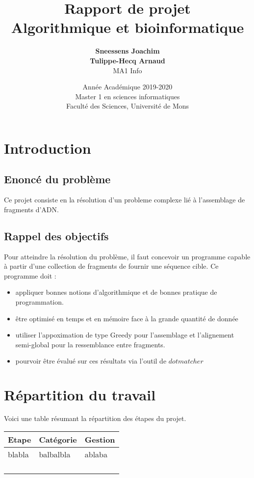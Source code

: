 \documentclass{article}
\title{
{\Huge \textbf{Rapport de projet}\\
Algorithmique et bioinformatique}}
\author{\textbf{Sneessens Joachim}\\\textbf{Tulippe-Hecq Arnaud}\\MA1 Info}
\date{Année Académique 2019-2020\\
Master 1 en sciences informatiques\\
\vspace{1cm}
Faculté des Sciences, Université de Mons}
\begin{document}
\maketitle

\newpage

\section{Introduction}

\subsection{Enoncé du problème}

Ce projet consiste en la résolution d'un probleme complexe lié à l'assemblage de fragments d'ADN.

\subsection{Rappel des objectifs}

Pour atteindre la résolution du problème, il faut concevoir un programme capable  à partir d'une collection de fragments de fournir une séquence cible. Ce programme doit :
\vspace{0.5cm}
\begin{itemize}
\item appliquer bonnes notions d'algorithmique et de bonnes pratique de programmation.
\item être optimisé en temps et en mémoire face à la grande quantité de donnée
\item utiliser l'appoximation de type Greedy pour l'assemblage et l'alignement semi-global pour la ressemblance entre fragments.
\item pourvoir être évalué sur ces résultats via l'outil de $dotmatcher$
\end{itemize} 

\section{Répartition du travail}

Voici une table résumant la répartition des étapes du projet.

\begin{table}[!htbp]
\begin{center}
\begin{tabular}{|p{3cm}||p{2.5cm}|p{3cm}|}
\hline
\textbf{Etape} & Catégorie & Gestion\\
\hline\hline
blabla & balbalbla & ablaba\\
\hline
\\
\hline
\\
\hline
\\
\hline
\\
\hline
\end{tabular}
\end{center}
\end{table}
\end{document}
